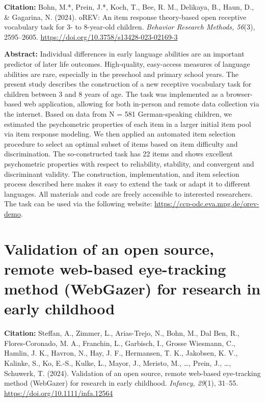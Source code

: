 \documentclass[
]{scrbook}
\begin{document}
\textbf{Citation:} Bohn, M.*, Prein, J.*, Koch, T., Bee, R. M., Delikaya, B., Haun, D., \& Gagarina, N. (2024). oREV: An item response theory-based open receptive vocabulary task for 3- to 8-year-old children. \emph{Behavior Research Methods, 56}(3), 2595--2605. \url{https://doi.org/10.3758/s13428-023-02169-3}

\textbf{Abstract:} Individual differences in early language abilities are an important predictor of later life outcomes. High-quality, easy-access measures of language abilities are rare, especially in the preschool and primary school years. The present study describes the construction of a new receptive vocabulary task for children between 3 and 8 years of age. The task was implemented as a browser-based web application, allowing for both in-person and remote data collection via the internet. Based on data from N = 581 German-speaking children, we estimated the psychometric properties of each item in a larger initial item pool via item response modeling. We then applied an automated item selection procedure to select an optimal subset of items based on item difficulty and discrimination. The so-constructed task has 22 items and shows excellent psychometric properties with respect to reliability, stability, and convergent and discriminant validity. The construction, implementation, and item selection process described here makes it easy to extend the task or adapt it to different languages. All materials and code are freely accessible to interested researchers. The task can be used via the following website: \url{https://ccp-odc.eva.mpg.de/orev-demo}.

\newpage

\section{Validation of an open source, remote web-based eye-tracking method (WebGazer) for research in early childhood}\label{validation-of-an-open-source-remote-web-based-eye-tracking-method-webgazer-for-research-in-early-childhood}

\textbf{Citation:} Steffan, A., Zimmer, L., Arias-Trejo, N., Bohn, M., Dal Ben, R., Flores-Coronado, M. A., Franchin, L., Garbisch, I., Grosse Wiesmann, C., Hamlin, J. K., Havron, N., Hay, J. F., Hermansen, T. K., Jakobsen, K. V., Kalinke, S., Ko, E.-S., Kulke, L., Mayor, J., Meristo, M., \ldots, Prein, J., \ldots, Schuwerk, T. (2024). Validation of an open source, remote web-based eye-tracking method (WebGazer) for research in early childhood. \emph{Infancy, 29}(1), 31--55. \url{https://doi.org/10.1111/infa.12564}
\end{document}
